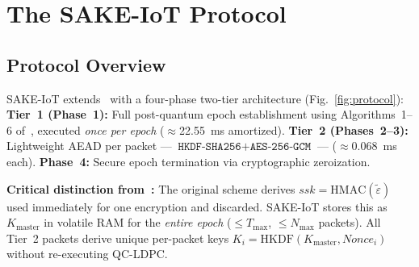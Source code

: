 \documentclass[runningheads]{llncs}
\newcommand{\GCM}{\texttt{AES-256-GCM}}
\newcommand{\HKDF}{\texttt{HKDF-SHA256}}
\newcommand{\Kmaster}{K_{\mathrm{master}}}
\newcommand{\Nmax}{N_{\max}}
\newcommand{\Tmax}{T_{\max}}
\begin{document}
\section{The SAKE-IoT Protocol}
\label{sec:protocol}

\subsection{Protocol Overview}

SAKE-IoT extends~\cite{kumari2022} with a four-phase two-tier architecture
(Fig.~\ref{fig:protocol}):
\textbf{Tier~1 (Phase~1):} Full post-quantum epoch establishment using
Algorithms~1--6 of~\cite{kumari2022}, executed \emph{once per epoch}
($\approx$22.55~ms amortized).
\textbf{Tier~2 (Phases~2--3):} Lightweight AEAD per packet ---
$\HKDF{} + \GCM{}$ --- ($\approx$0.068~ms each).
\textbf{Phase~4:} Secure epoch termination via cryptographic zeroization.

\noindent\textbf{Critical distinction from~\cite{kumari2022}:}
The original scheme derives $\mathit{ssk} = \mathrm{HMAC}(\tilde{\varepsilon})$
used immediately for one encryption and discarded. SAKE-IoT stores this as
$\Kmaster$ in volatile RAM for the \emph{entire epoch} ($\leq \Tmax$,
$\leq \Nmax$ packets). All Tier~2 packets derive unique per-packet keys
$K_i = \mathrm{HKDF}(\Kmaster, \mathit{Nonce}_i)$ without re-executing QC-LDPC.
\end{document}
